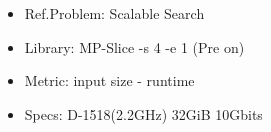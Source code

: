 \begin{frame}
\begin{minipage}{.41\paperwidth}
\begin{figure}
        \begin{itemize}
            \item Ref.Problem: Scalable Search
            \item Library: MP-Slice -s 4 -e 1 (Pre on)
            \item Metric: input size - runtime
            \item Specs: D-1518(2.2GHz) 32GiB 10Gbits
        \end{itemize}
    \end{figure}
    \end{minipage}

\end{frame}

